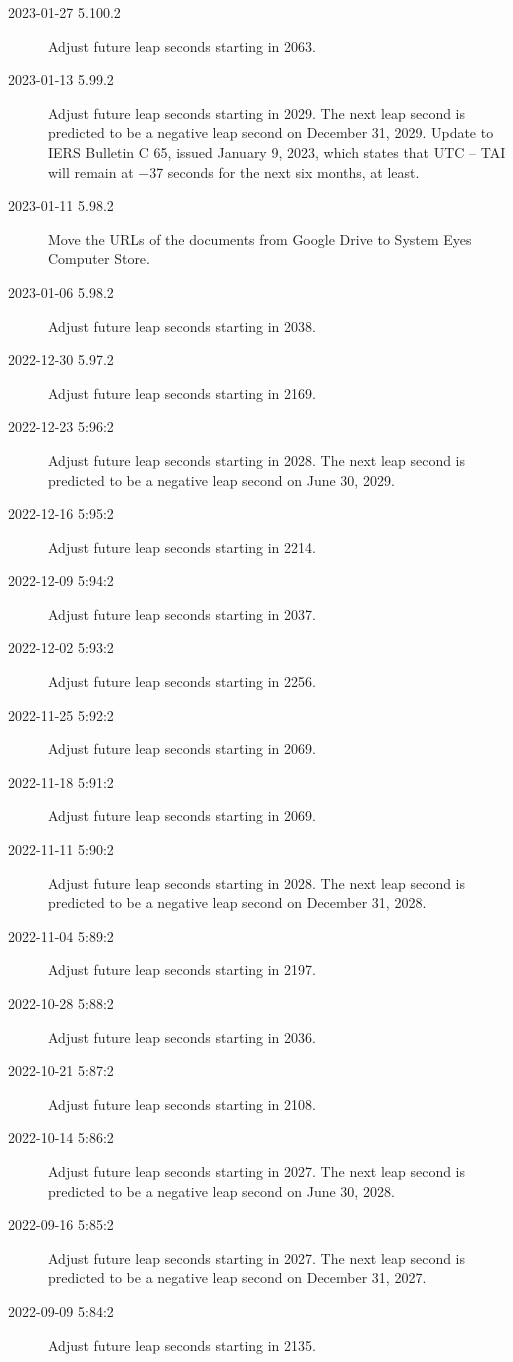 \documentclass[letterpaper,twoside]{article}
\begin{document}
\begin{description}
\item[2023-01-27 5.100.2]Adjust future leap seconds starting in 2063.
\item[2023-01-13 5.99.2]Adjust future leap seconds starting in 2029.
  The next leap second is predicted to be a negative leap second
  on December 31, 2029.
  Update to IERS Bulletin C 65,
  issued January 9, 2023, which states that UTC -- TAI
  will remain at \num{-37} seconds for the next six months, at least.
\item[2023-01-11 5.98.2]Move the URLs of the documents from Google Drive
  to System Eyes Computer Store.
\item[2023-01-06 5.98.2]Adjust future leap seconds starting in 2038.
\item[2022-12-30 5.97.2]Adjust future leap seconds starting in 2169.
\item[2022-12-23 5:96:2]Adjust future leap seconds starting in 2028.
  The next leap second is predicted to be a negative leap second
  on June 30, 2029.
\item[2022-12-16 5:95:2]Adjust future leap seconds starting in 2214.
\item[2022-12-09 5:94:2]Adjust future leap seconds starting in 2037.
\item[2022-12-02 5:93:2]Adjust future leap seconds starting in 2256.
\item[2022-11-25 5:92:2]Adjust future leap seconds starting in 2069.
\item[2022-11-18 5:91:2]Adjust future leap seconds starting in 2069.
\item[2022-11-11 5:90:2]Adjust future leap seconds starting in 2028.
  The next leap second is predicted to be a negative leap second
  on December 31, 2028.
\item[2022-11-04 5:89:2]Adjust future leap seconds starting in 2197.
\item[2022-10-28 5:88:2]Adjust future leap seconds starting in 2036.
\item[2022-10-21 5:87:2]Adjust future leap seconds starting in 2108.
\item[2022-10-14 5:86:2]Adjust future leap seconds starting in 2027.
  The next leap second is predicted to be a negative leap second
  on June 30, 2028.
\item[2022-09-16 5:85:2]Adjust future leap seconds starting in 2027.
  The next leap second is predicted to be a negative leap second
  on December 31, 2027.
\item[2022-09-09 5:84:2]Adjust future leap seconds starting in 2135.

\end{description}
\end{document}
